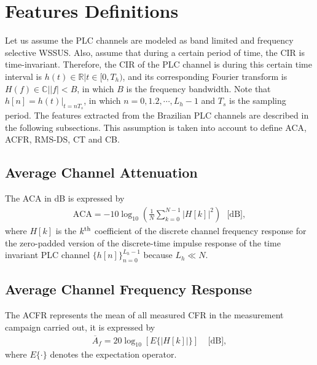 \documentclass[journal]{IEEEtran}
\begin{document}
	\section{Features Definitions}
	\label{sec:parameters}
	
	Let us assume the PLC channels are modeled as band limited and frequency selective \ac{WSSUS}. Also, assume that during a certain period of time, the \ac{CIR} is time-invariant. Therefore, the \ac{CIR} of the \ac{PLC} channel is during this certain time interval is  $ h(t)\in \mathbb{R}|t\in[0,T_h)$,  and its corresponding Fourier transform is $H(f)\in \mathbb{C}||f|<B$, in which $B$ is the frequency bandwidth. Note that $h[n]=h(t)|_{t=nT_s}$, in which $n=0,1.2,\cdots,L_h-1 $ and $T_s$ is the sampling period. The features extracted from the Brazilian PLC channels are described in the following subsections. This assumption is taken into account to define \ac{ACA}, \ac{ACFR}, \ac{RMS-DS}, \ac{CT} and \ac{CB}.
	
	\subsection{Average Channel Attenuation}
	The ACA in dB is expressed by
	\begin{eqnarray}
	\textrm{ACA}=-10\log_{10}\left(\frac{1}{N}\sum_{k=0}^{N-1}|H[k]|^2\right) \ \ \ \mbox{[dB]},
	\end{eqnarray}
	where $H[k]$ is the $k^{\rm th}$ coefficient of the discrete channel frequency response for the zero-padded version of the discrete-time impulse response of the time invariant PLC channel $\{h[n]\}_{n=0}^{L_h-1}$ because $L_h \ll N$.
	
	
	\subsection{Average Channel Frequency Response}
	The \ac{ACFR} represents the mean of all measured \ac{CFR} in the measurement campaign carried out, it is expressed by
	\begin{eqnarray}
	\overline{A}_f=20\log_{10}\left[E\{|H[k]|\}\right] \ \ \ \ \ \mbox{[dB]},
	\end{eqnarray}
	where $E\{\cdot\}$ denotes the expectation operator.
	
\end{document}
